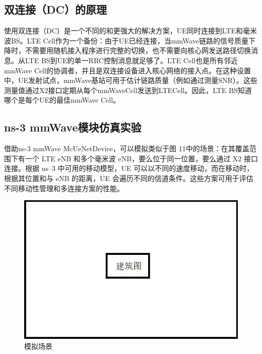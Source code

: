\documentclass{article}
\begin{document}
\subsection{双连接（DC）的原理}
使用双连接（DC）是一个不同的和更强大的解决方案，UE同时连接到LTE和毫米波BS。LTE Cell作为一个备份：由于UE已经连接，当mmWave链路的信号质量下降时，不需要用随机接入程序进行完整的切换，也不需要向核心网发送路径切换消息。从LTE BS到UE的单一RRC控制消息就足够了。LTE Cell也是所有邻近mmWave Cell的协调者，并且是双连接设备进入核心网络的接入点。在这种设置中，UE发射试点，mmWave基站可用于估计链路质量（例如通过测量SNR）。这些测量值通过X2接口定期从每个mmWaveCell发送到LTECell。因此，LTE BS知道哪个是每个UE的最佳mmWave Cell。
\subsection{ns-3 mmWave模块仿真实验}
借助ns-3 mmWave McUeNetDevice，可以模拟类似于图 11中的场景：在其覆盖范围下有一个 LTE eNB 和多个毫米波 eNB，要么位于同一位置，要么通过 X2 接口连接。根据 ns–3 中可用的移动模型，UE 可以以不同的速度移动，而在移动时，根据其位置和与 eNB 的距离，UE 会遍历不同的信道条件。这些方案可用于评估不同移动性管理和多连接方案的性能。
\begin{figure}[ht]
	\centering
	\includegraphics[scale=0.4]{picture/5G-building.jpg}
	\caption{模拟场景}
	\label{fig:delay}
\end{figure}
\end{document}
